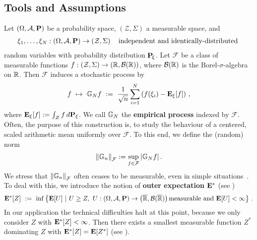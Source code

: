 \subsection{Tools and Assumptions}

Let 
$
  \left( 
    \Omega,
    \mathcal{A},
    \P
  \right)
$
be a probability space,
$
  \left( 
    \mathcal{Z},
    \Sigma
  \right)
$
a measurable space, and 
\begin{gather*}
  \xi_1,\ldots,\xi_N
  :
  \left( 
    \Omega,
    \mathcal{A},
    \P
  \right)
  \to
  \left( 
    \mathcal{Z},
    \Sigma
  \right)
  \quad
  \text{independent and identically-distributed
  }
\end{gather*}
random variables
with probability distribution $\P_{\!\xi}$.
Let $\mathcal{F}$ be a class of measurable functions 
$
  f:
  \left( 
    \mathcal{Z},
    \Sigma
  \right)
    \to
  \left( 
    \R,
    \mathcal{B}(\R)
  \right)
$, where
$
    \mathcal{B}(\R)
$
is the Borel-$\sigma$-algebra on $\R$.
Then $\mathcal{F}$
induces a stochastic process by
\begin{gather}
  f
  \ 
  \mapsto
  \ 
  \G_N f 
  \ 
  :=
  \ 
  \frac{1}{\sqrt{n}}
  \sum_{i=1}^{N} 
  \left(
    f(\xi_i)
    -
    \E_\xi[f]
  \right)
  \,,
\end{gather}
where
$
    \E_\xi[f]
    :=
    \int_\mathcal{Z}
    f
    \,
    d\P_\xi
$.
We call
$\G_N$ the  \textbf{empirical process} indexed by $\mathcal{F}$.
Often, the purpose of this construction is, to study the behaviour of a centered, scaled arithmetic mean uniformly over $\mathcal{F}$.
To this end, we define the (random) norm
\begin{gather}
  \norm{\G_n}_\mathcal{F}
  :=
  \sup_
        { f \in \mathcal{F}}
        \left|
          \G_N f
        \right|
        .
\end{gather}
We stress that 
$
  \norm{\G_n}_\mathcal{F}
$
often ceases to be measurable, even in simple situations~\cite[page 3]{vaart2013}.
To deal with this, we introduce the notion of \textbf{outer expectation} $\E^*$ (see \cite[page~6]{vaart2013})
\begin{gather*}
  \E^*[Z]
  \ 
  :=
  \ 
    \inf
  \left\{ 
    \E[U]
  \ 
  \lvert
  \ 
    U\ge Z,
    \ 
    U:
  \left( 
    \Omega,
    \mathcal{A},
    \P
  \right)
  \to 
  \left( 
    \overline{\R},
    \mathcal{B}(\overline{\R})
  \right)
  \text{measurable and}
  \ 
  \E[U]<\infty
  \right\}
  \,.
\end{gather*}
In our application the technical difficulties halt at this point, because we only consider $Z$ with $\E^*[Z]<\infty$. Then there exists a smallest measurable function $Z^*$ dominating $Z$ with
$\E^*[Z]=\E[Z^*]$ (see \cite[Lemma~1.2.1]{vaart2013}).

